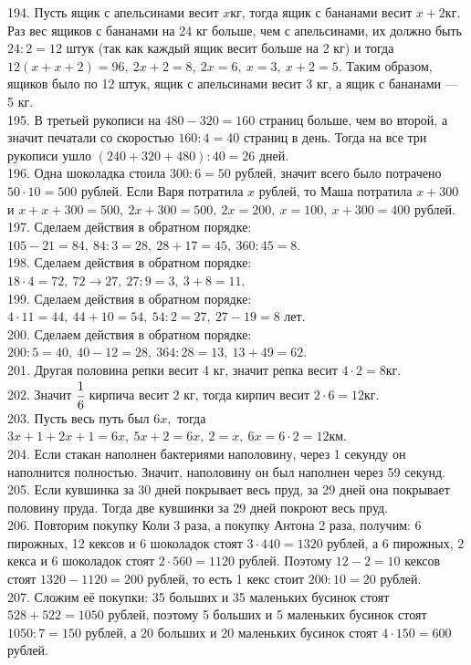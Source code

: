 \documentclass[12pt]{article}
\begin{document}
194. Пусть ящик с апельсинами весит $x$кг, тогда ящик с бананами весит $x+2$кг. Раз вес ящиков с бананами на 24 кг больше, чем с апельсинами, их должно быть $24:2=12$ штук (так как каждый ящик весит больше на 2 кг) и тогда $12(x+x+2)=96,\ 2x+2=8,\ 2x=6,\ x=3,\ x+2=5.$ Таким образом, ящиков было по 12 штук, ящик с апельсинами весит 3 кг, а ящик с бананами --- 5 кг.\\
195. В третьей рукописи на $480-320=160$ страниц больше, чем во второй, а значит печатали со скоростью $160:4=40$ страниц в день. Тогда на все три рукописи ушло $(240+320+480):40=26$ дней.\\
196. Одна шоколадка стоила $300:6=50$ рублей, значит всего было потрачено $50\cdot10=500$ рублей. Если Варя потратила $x$ рублей, то Маша потратила $x+300$ и $x+x+300=500,\ 2x+300=500,\ 2x=200,\ x=100,\ x+300=400$ рублей.\\
197. Сделаем действия в обратном порядке: $105-21=84,\ 84:3=28,\ 28+17=45,\ 360:45=8.$\\
198. Сделаем действия в обратном порядке: $18\cdot4=72,\ 72\rightarrow27,\ 27:9=3,\ 3+8=11.$\\
199. Сделаем действия в обратном порядке: $4\cdot11=44,\ 44+10=54,\ 54:2=27,\ 27-19=8$ лет.\\
200. Сделаем действия в обратном порядке: $200:5=40,\ 40-12=28,\ 364:28=13,\ 13+49=62.$\\
201. Другая половина репки весит 4 кг, значит репка весит $4\cdot2=8$кг.\\
202. Значит $\cfrac{1}{6}$ кирпича весит 2 кг, тогда кирпич весит $2\cdot6=12$кг.\\
203. Пусть весь путь был $6x,$ тогда $3x+1+2x+1=6x,\ 5x+2=6x,\ 2=x,\ 6x=6\cdot2=12$км.\\
204. Если стакан наполнен бактериями наполовину, через 1 секунду он наполнится полностью. Значит, наполовину он был наполнен через 59 секунд.\\
205. Если кувшинка за 30 дней покрывает весь пруд, за 29 дней она покрывает половину пруда. Тогда две кувшинки за 29 дней покроют весь пруд.\\
206. Повторим покупку Коли 3 раза, а покупку Антона 2 раза, получим: 6 пирожных, 12 кексов и 6 шоколадок стоят $3\cdot440=1320$ рублей, а 6 пирожных, 2 кекса и 6 шоколадок стоят $2\cdot560=1120$ рублей. Поэтому $12-2=10$ кексов стоят $1320-1120=200$ рублей, то есть 1 кекс стоит $200:10=20$ рублей.\\
207. Сложим её покупки: 35 больших и 35 маленьких бусинок стоят $528+522=1050$ рублей, поэтому 5 больших и 5 маленьких бусинок стоят $1050:7=150$ рублей, а 20 больших и 20 маленьких бусинок стоят $4\cdot150=600$ рублей.\\
\end{document}
